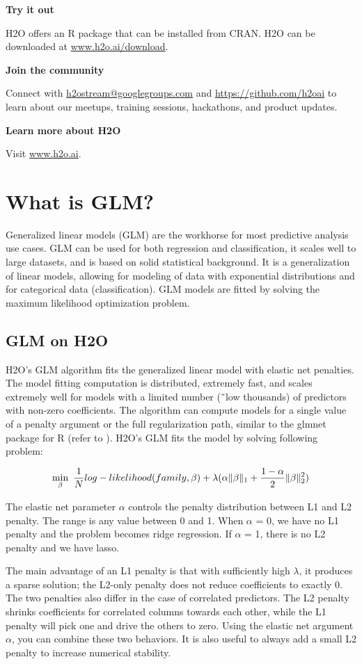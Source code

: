 \documentclass{article}[11pt]
\begin{document}
\textbf{Try it out}

H2O offers an R package that can be installed from CRAN. H2O can be downloaded at {\url{www.h2o.ai/download}}.

\textbf{Join the community}

Connect with {\url{h2ostream@googlegroups.com}} and {\url{https://github.com/h2oai}} to learn about our meetups, training sessions, hackathons, and product updates.

\textbf{Learn more about H2O}

Visit {\url{www.h2o.ai}}.

\newpage

\section{What is GLM?}
Generalized linear models (GLM) are the workhorse for most predictive analysis use cases. GLM can be used for both regression and classification, it scales well to large datasets, and is based on solid statistical background. It is a generalization of linear models, allowing for modeling of data with exponential distributions and for categorical data (classification). GLM models are fitted by solving the maximum likelihood optimization problem.

\subsection{GLM on H2O}
H2O's GLM algorithm fits the generalized linear model with elastic net penalties. The model fitting computation is distributed, extremely fast, and scales extremely well for models with a limited number (\~\ low thousands) of predictors with non-zero coefficients. The algorithm can compute models for a single value of a penalty argument or the full regularization path, similar to the glmnet package for R (refer to ). 
H2O's GLM fits the model by solving following problem:

\[ \min\limits_{\beta}\ {{1\over{N}} log-likelihood(family,\beta)  + \lambda (\alpha \| \beta \|_1}  + {1- \alpha \over 2} \| \beta \|_2^2) \]

The elastic net parameter $\alpha$ controls the penalty distribution between L1 and L2 penalty. The range is any value between 0 and 1. When $\alpha$ = 0, we have no L1 penalty and the problem becomes ridge regression. If $\alpha$ = 1, there is no L2 penalty and we have lasso.

The main advantage of an L1 penalty is that with sufficiently high $\lambda$, it produces a sparse solution; the L2-only penalty does not reduce coefficients to exactly 0. The two penalties also differ in the case of correlated predictors. The L2 penalty shrinks coefficients for correlated columns towards each other, while the L1 penalty will pick one and drive the others to zero. Using the elastic net argument $\alpha$, you can combine these two behaviors. It is also useful to always add a small L2 penalty to increase numerical stability.
\end{document}
